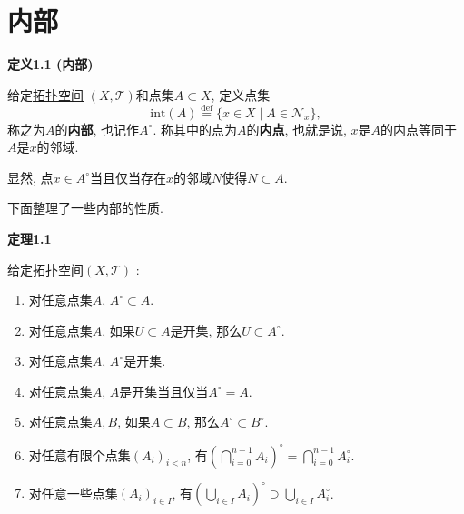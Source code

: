 


\setlength{\abovedisplayskip}{1pt}
\setlength{\belowdisplayskip}{1pt}

\section{内部}

\hypertarget{sec:定义1.1}{}
\noindent\textbf{定义1.1 (内部)}

给定\href{01 拓扑空间#nameddest=sec:定义1.1}{拓扑空间}
$(X,\mathcal{T})$和点集$A\subset X$, 定义点集
\[
    \mathrm{int}(A)\overset{\mathrm{def}}{=}\{x\in X\mid
    A\in\mathcal{N}_x\},
\]
称之为$A$的\textbf{内部}, 也记作$A^\circ$. 称其中的点为$A$的\textbf{内点},
也就是说, $x$是$A$的内点等同于$A$是$x$的邻域.

显然, 点$x\in A^\circ$当且仅当存在$x$的邻域$N$使得$N\subset A$.

\vspace{10pt}

下面整理了一些内部的性质.

\vspace{10pt}

\hypertarget{sec:定理1.1}{}
\noindent\textbf{定理1.1}

给定拓扑空间$(X,\mathcal{T})$ :
\begin{enumerate}
    \item 对任意点集$A$, $A^\circ\subset A$.
    \item 对任意点集$A$, 如果$U\subset A$是开集, 那么$U\subset A^\circ$.
    \item 对任意点集$A$, $A^\circ$是开集.
    \item 对任意点集$A$, $A$是开集当且仅当$A^\circ=A$.
    \item 对任意点集$A,B$, 如果$A\subset B$, 那么$A^\circ\subset B^\circ$.
    \vspace{3pt}
    \item 对任意有限个点集$(A_i)_{i<n}$, 有$\displaystyle
    \left(\bigcap_{i=0}^{n-1}A_i\right)^\circ=\bigcap_{i=0}^{n-1}A_i^\circ$.
    \vspace{3pt}
    \item 对任意一些点集$(A_i)_{i\in I}$, 有$\displaystyle
    \left(\bigcup_{i\in I}A_i\right)^\circ\supset\bigcup_{i\in I}A_i^\circ$.
\end{enumerate}



